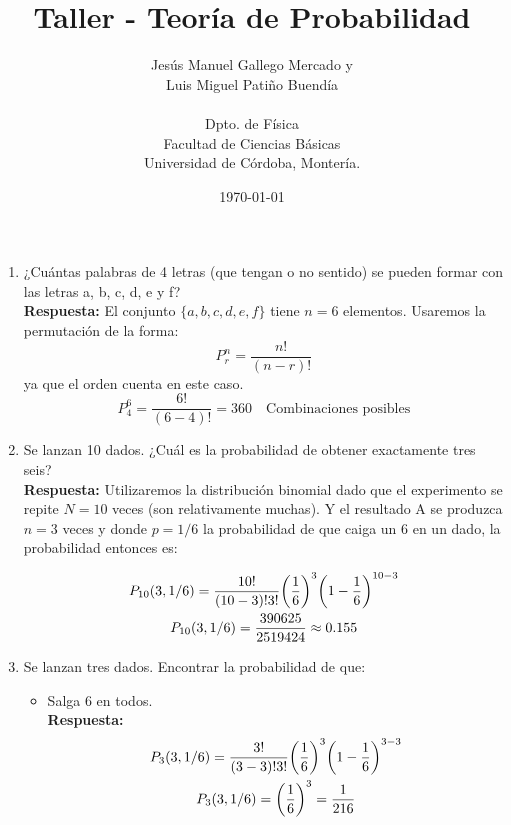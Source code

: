 \documentclass[12pt]{article}
\title{{\Large \textbf{Taller - Teoría de Probabilidad}}}
\author{Jesús Manuel Gallego Mercado y\\ 
Luis Miguel Patiño Buendía\\\\
\small{Dpto. de Física}\\
\small{Facultad de Ciencias Básicas}\\
\small{Universidad de Córdoba, Montería.}
}
\date{\small{\today}}
\newcommand{\up}[1]{^{#1}}
\begin{document}
\maketitle
\begin{enumerate}
    \item ¿Cuántas palabras de 4 letras (que tengan o no sentido) se pueden formar con las letras a, b, c, d, e y f?\\
    
    \textbf{Respuesta:} 
    El conjunto $\{a,b,c,d,e,f\}$ tiene $n=6$ elementos. Usaremos la permutación de la forma:
    \begin{equation}
        P\up{n}_{r} = \frac{n!}{(n-r)!}
    \end{equation}
    ya que el orden cuenta en este caso.
    \begin{equation}
        P\up{6}_{4} = \frac{6!}{(6-4)!} = 360 \quad \text{Combinaciones posibles}
    \end{equation}
    
    \item Se lanzan 10 dados. ¿Cuál es la probabilidad de obtener exactamente tres seis?\\
    
      \textbf{Respuesta:} 
      Utilizaremos la distribución binomial dado que el experimento se repite $N=10$ veces (son relativamente muchas). Y el resultado A se produzca $n=3$ veces y donde $p=1/6$ la probabilidad de que caiga un $6$ en un dado, la probabilidad entonces es:
    
    \begin{gather}
        P_{10}(3, 1/6) = \frac{10!}{(10-3)!3!}\qty(\frac{1}{6})\up{3}\qty(1-\frac{1}{6})\up{10-3}\\
         P_{10}(3, 1/6) = \frac{390625}{2519424}\approx 0.155
    \end{gather}
    
    
    \item Se lanzan tres dados. Encontrar la probabilidad de que:
    \begin{itemize}
        \item Salga 6 en todos.\\
        
        \textbf{Respuesta:}
          \begin{gather}
        P_{3}(3, 1/6) = \frac{3!}{(3-3)!3!}\qty(\frac{1}{6})\up{3}\qty(1-\frac{1}{6})\up{3-3}\\
         P_{3}(3, 1/6) = \qty(\frac{1}{6})\up{3} =  \frac{1}{216}
    \end{gather}
        

\end{itemize}
\end{enumerate}
\end{document}
